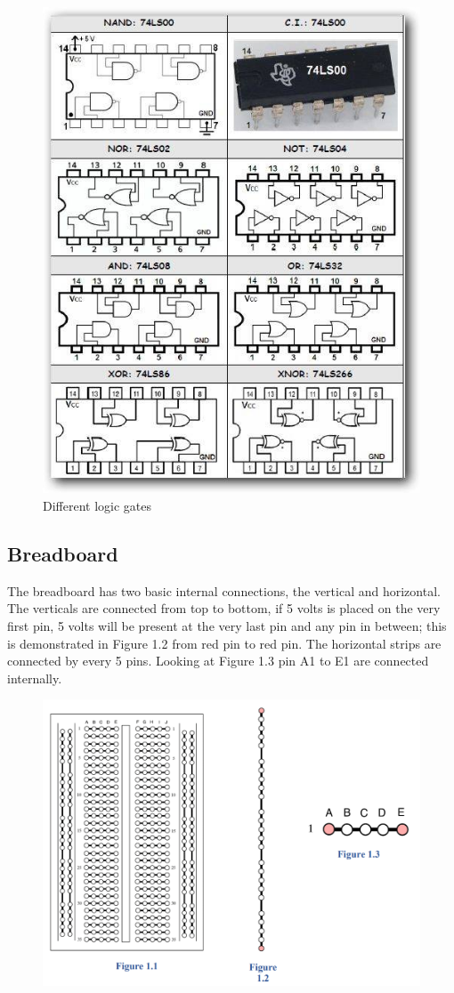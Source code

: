 \begin{figure}[H]
    \centering
    \includegraphics[width=0.75\linewidth]{img/logic_gates.jpg}
    \caption{Different logic gates}
    \label{fig:enter-label}
\end{figure}

\subsection*{Breadboard}

The breadboard has two basic internal connections, the vertical and horizontal. The verticals are connected from top to bottom, if 5 volts is placed on the very first pin, 5 volts will be present at the very last pin and any pin in between; this is demonstrated in Figure 1.2 from red pin to red pin. The horizontal strips are connected by every 5 pins. Looking at Figure 1.3 pin A1 to E1 are connected internally. 

\begin{figure}[H]
    \centering
    \includegraphics[width=1\linewidth]{img/breadboard.png}
    \label{fig:breadboard}
\end{figure}

\newpage
